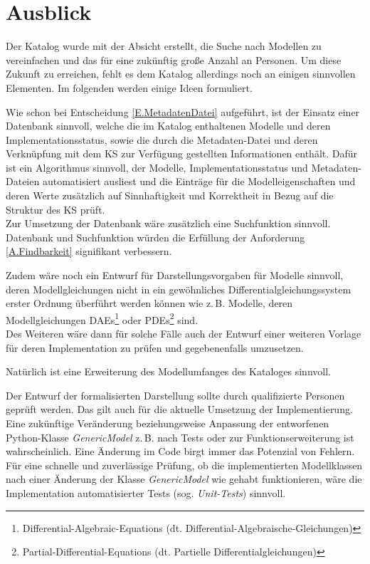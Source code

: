 \section{Ausblick} 
\label{Ch:ZsmfsgAusblick:Sec:Ausblick}
Der Katalog wurde mit der Absicht erstellt, die Suche nach Modellen zu vereinfachen und das für eine zukünftig große Anzahl an Personen. Um diese Zukunft zu erreichen,  fehlt es dem Katalog allerdings noch an einigen sinnvollen Elementen. Im folgenden werden einige Ideen formuliert.

Wie schon bei Entscheidung \ref{E.MetadatenDatei} aufgeführt, ist der Einsatz einer Datenbank sinnvoll, welche die im Katalog enthaltenen Modelle und deren Implementationsstatus, sowie die durch die Metadaten-Datei und deren Verknüpfung mit dem KS zur Verfügung gestellten Informationen enthält. Dafür ist ein Algorithmus sinnvoll, der Modelle, Implementationsstatus und Metadaten-Dateien automatisiert ausliest und die Einträge für die Modelleigenschaften und deren Werte zusätzlich auf Sinnhaftigkeit und Korrektheit in Bezug auf die Struktur des KS prüft. \\
Zur Umsetzung der Datenbank wäre zusätzlich eine Suchfunktion sinnvoll. Datenbank und Suchfunktion würden die Erfüllung der Anforderung \ref{A.Findbarkeit} signifikant verbessern.

Zudem wäre noch ein Entwurf für Darstellungsvorgaben für Modelle sinnvoll, deren Modellgleichungen nicht in ein gewöhnliches Differentialgleichungssystem erster Ordnung überführt werden können wie z.\,B. Modelle, deren Modellgleichungen DAEs\footnote{Differential-Algebraic-Equations (dt. Differential-Algebraische-Gleichungen)} oder PDEs\footnote{Partial-Differential-Equations (dt. Partielle Differentialgleichungen)} sind.\\
Des Weiteren wäre dann für solche Fälle auch der Entwurf einer weiteren Vorlage für deren Implementation zu prüfen und gegebenenfalls umzusetzen.

Natürlich ist eine Erweiterung des Modellumfanges des Kataloges sinnvoll.

Der Entwurf der formalisierten Darstellung sollte durch qualifizierte Personen geprüft werden. Das gilt auch für die aktuelle Umsetzung der Implementierung. \\
Eine zukünftige Veränderung beziehungsweise Anpassung der entworfenen Python-Klasse \textit{GenericModel} z.\,B. nach Tests oder zur Funktionserweiterung ist wahrscheinlich. Eine Änderung im Code birgt immer das Potenzial von Fehlern. Für eine schnelle und zuverlässige Prüfung, ob die implementierten Modellklassen nach einer Änderung der Klasse \textit{GenericModel} wie gehabt funktionieren, wäre die Implementation automatisierter Tests (sog. \textit{Unit-Tests}) sinnvoll.

